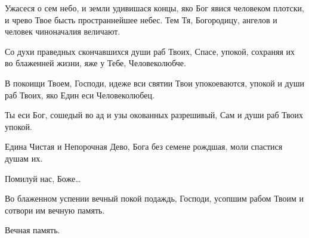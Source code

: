 \begin{mymulticols}
 Ужасеся о сем небо, и земли удивишася концы, яко Бог явися человеком плотски, и чрево Твое бысть пространнейшее небес. Тем Тя, Богородицу, ангелов и человек чиноначалия величают. 

\TrisviatoePoOtcheNash

 Со духи праведных скончавшихся души раб Твоих, Спасе, упокой, сохраняя их во блаженней жизни, яже у Тебе, Человеколюбче. 

В покоищи Твоем, Господи, идеже вси святии Твои упокоеваются, упокой и души раб Твоих, яко Един еси Человеколюбец. 

\slavan

Ты еси Бог, сошедый во ад и узы окованных разрешивый, Сам и души раб Твоих упокой. 

\inynen

Едина Чистая и Непорочная Дево, Бога без семене рождшая, моли спастися душам их. 

 Помилуй нас, Боже… 


Во блаженном успении вечный покой подаждь, Господи, усопшим рабом Твоим  и сотвори им вечную память. 

 Вечная память. 

\end{mymulticols}

\mychapterending

